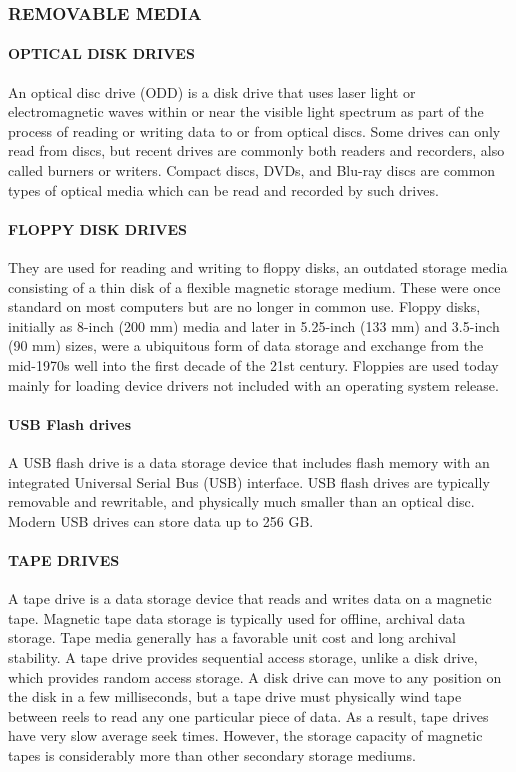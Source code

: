 \documentclass[a4paper,28pt,twoside,openright]{report}
\begin{document}
\subsubsection*{REMOVABLE MEDIA}
	\paragraph{OPTICAL DISK DRIVES}
	 An optical disc drive (ODD) is a disk drive that uses laser light or electromagnetic
	waves within or near the visible light spectrum as part of the process of reading or writing data to or
	from optical discs. Some drives can only read from discs, but recent drives are commonly both readers
	and recorders, also called burners or writers. Compact discs, DVDs, and Blu-ray discs are common
	types of optical media which can be read and recorded by such drives.
	\paragraph{FLOPPY DISK DRIVES} 
	They are used for reading and writing to floppy disks, an outdated storage media
	consisting of a thin disk of a flexible magnetic storage medium. These were once standard on most
	computers but are no longer in common use. Floppy disks, initially as 8-inch (200 mm) media and later
	in 5.25-inch (133 mm) and 3.5-inch (90 mm) sizes, were a ubiquitous form of data storage and
	exchange from the mid-1970s well into the first decade of the 21st century. Floppies are used today
	mainly for loading device drivers not included with an operating system release.
	\paragraph{USB Flash drives}
	 A USB flash drive is a data storage device that includes flash memory with an
	integrated Universal Serial Bus (USB) interface. USB flash drives are typically removable and
	rewritable, and physically much smaller than an optical disc. Modern USB drives can store data up to
	256 GB.
	\paragraph{TAPE DRIVES}
	 A tape drive is a data storage device that reads and writes data on a magnetic
	tape. Magnetic tape data storage is typically used for offline, archival data storage. Tape media
	generally has a favorable unit cost and long archival stability. A tape drive provides sequential
	access storage, unlike a disk drive, which provides random access storage. A disk drive can move to
	any position on the disk in a few milliseconds, but a tape drive must physically wind tape between reels
	to read any one particular piece of data. As a result, tape drives have very slow average seek times.
	However, the storage capacity of magnetic tapes is considerably more than other secondary storage
	mediums.
\end{document}
